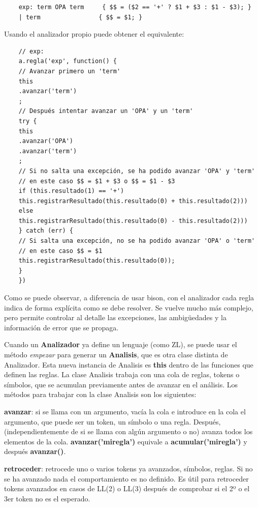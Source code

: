\documentclass{report}
\begin{document}
	\begin{BVerbatim}
	exp: term OPA term     { $$ = ($2 == '+' ? $1 + $3 : $1 - $3); }
	| term                { $$ = $1; }
	\end{BVerbatim}
	
	Usando el analizador propio puede obtener el equivalente:
	
	\begin{BVerbatim}
	// exp:
	a.regla('exp', function() {
	// Avanzar primero un 'term'
	this
	.avanzar('term')
	;
	// Después intentar avanzar un 'OPA' y un 'term'
	try {
	this
	.avanzar('OPA')
	.avanzar('term')
	;
	// Si no salta una excepción, se ha podido avanzar 'OPA' y 'term'
	// en este caso $$ = $1 + $3 o $$ = $1 - $3 
	if (this.resultado(1) == '+')
	this.registrarResultado(this.resultado(0) + this.resultado(2)))
	else
	this.registrarResultado(this.resultado(0) - this.resultado(2)))
	} catch (err) {
	// Si salta una excepción, no se ha podido avanzar 'OPA' o 'term'
	// en este caso $$ = $1
	this.registrarResultado(this.resultado(0));
	}
	})
	\end{BVerbatim}
	
	Como se puede observar, a diferencia de usar bison, con el analizador cada regla indica de forma explícita como se debe resolver. Se vuelve mucho más complejo, pero permite controlar al detalle las excepciones, las ambigüedades y la información de error que se propaga. 
	
	\vspace{10px}
	
	Cuando un \textbf{Analizador} ya define un lenguaje (como ZL), se puede usar el método \textit{empezar} para generar un \textbf{Analisis}, que es otra clase distinta de Analizador. Esta nueva instancia de Analisis es \textbf{this} dentro de las funciones que definen las reglas. La clase Analisis trabaja con una cola de reglas, tokens o símbolos, que se acumulan previamente antes de avanzar en el análisis. Los métodos para trabajar con la clase Analisis son los siguientes:
	
	\vspace{10px}
	\noindent
	\textbf{avanzar}: si se llama con un argumento, vacía la cola e introduce en la cola el argumento, que puede ser un token, un símbolo o una regla. Después, (independientemente de si se llama con algún argumento o no) avanza todos los elementos de la cola. \textbf{avanzar('miregla')} equivale a \textbf{acumular('miregla')} y después \textbf{avanzar()}.
	
	\vspace{10px}
	\noindent
	\textbf{retroceder}: retrocede uno o varios tokens ya avanzados, símbolos, reglas. Si no se ha avanzado nada el comportamiento es no definido. Es útil para retroceder tokens avanzados en casos de LL(2) o LL(3) después de comprobar si el 2º o el 3er token no es el esperado. 
	
\end{document}
